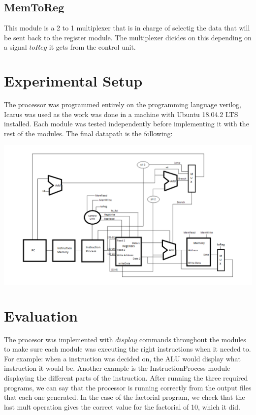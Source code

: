 \documentclass[12pt,a4paper]{article}
\begin{document}
\subsection{MemToReg}
\text This module is a 2 to 1 multiplexer that is in charge of selectig the data that will be sent back to the register module. The multiplexer dicides on this depending on a signal $toReg$ it gets from the control unit.


\section{Experimental Setup}
\text The processor was programmed entirely on the programming language verilog, Icarus was used as the work was done in a machine with Ubuntu 18.04.2 LTS installed. Each module was tested independently before implementing it with the rest of the modules. The final datapath is the following:

\includegraphics[width=14cm]{./datapath.png}

\section{Evaluation}
The procesor was implemented with $display$ commands throughout the modules to make sure each module was executing the right instructions when it needed to. For example: when a instruction was decided on, the ALU would display what instruction it would be. Another example is the InstructionProcess module displaying the different parts of the instruction. After running the three required programs, we can say that the processor is running correctly from the output files that each one generated. In the case of the factorial program, we check that the last mult operation gives the correct value for the factorial of 10, which it did.
\end{document}
